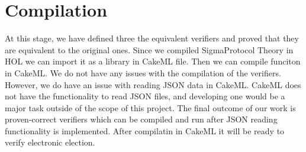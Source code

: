 \section{Compilation}
At this stage, we have defined three the equivalent verifiers and proved that they are equivalent to the original ones. 
Since we compiled SigmaProtocol Theory in HOL we can import it as a library in CakeML file.
Then we can compile funciton in CakeML.
We do not have any issues with the compilation 
of the verifiers. However, we do have an issue with reading JSON data in CakeML. 
CakeML does not have the functionality to read JSON files, and developing one would be a major 
task outside of the scope of this project. The final outcome of our work is proven-correct verifiers 
which can be compiled and run after JSON reading functionality is implemented.
After compilatin in CakeML it will be ready to verify electronic election.
